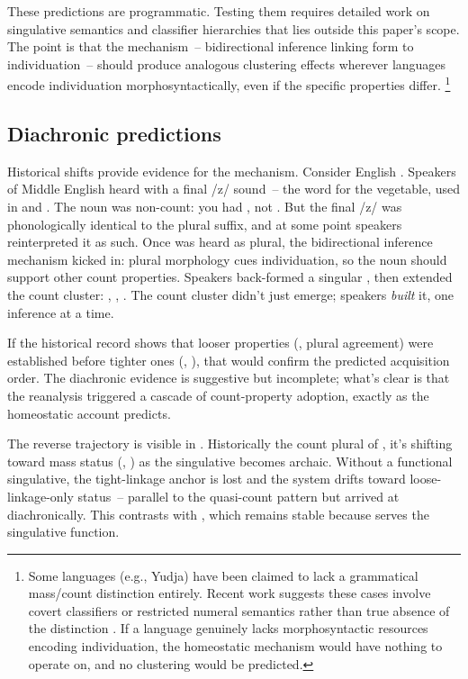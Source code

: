 \documentclass[12pt,a4paper]{article}
\begin{document}
These predictions are programmatic. Testing them requires detailed work on singulative semantics and classifier hierarchies that lies outside this paper's scope. The point is that the mechanism~-- bidirectional inference linking form to individuation~-- should produce analogous clustering effects wherever languages encode individuation morphosyntactically, even if the specific properties differ.%
\footnote{Some languages (e.g., Yudja) have been claimed to lack a grammatical mass/count distinction entirely. Recent work suggests these cases involve covert classifiers or restricted numeral semantics rather than true absence of the distinction \citep{lima2014}. If a language genuinely lacks morphosyntactic resources encoding individuation, the homeostatic mechanism would have nothing to operate on, and no clustering would be predicted.}

\subsection{Diachronic predictions}

Historical shifts provide evidence for the mechanism. Consider English . Speakers of Middle English heard  with a final /z/ sound~-- the word for the vegetable, used in  and . The noun was non-count: you had , not . But the final /z/ was phonologically identical to the plural suffix, and at some point speakers reinterpreted it as such. Once  was heard as plural, the bidirectional inference mechanism kicked in: plural morphology cues individuation, so the noun should support other count properties. Speakers back-formed a singular , then extended the count cluster: , , . The count cluster didn't just emerge; speakers \textit{built} it, one inference at a time.

If the historical record shows that looser properties (, plural agreement) were established before tighter ones (, ), that would confirm the predicted acquisition order. The diachronic evidence is suggestive but incomplete; what's clear is that the reanalysis triggered a cascade of count-property adoption, exactly as the homeostatic account predicts.

The reverse trajectory is visible in . Historically the count plural of , it's shifting toward mass status (, ) as the singulative  becomes archaic. Without a functional singulative, the tight-linkage anchor is lost and the system drifts toward loose-linkage-only status~-- parallel to the quasi-count pattern but arrived at diachronically. This contrasts with , which remains stable because  serves the singulative function.
\end{document}
